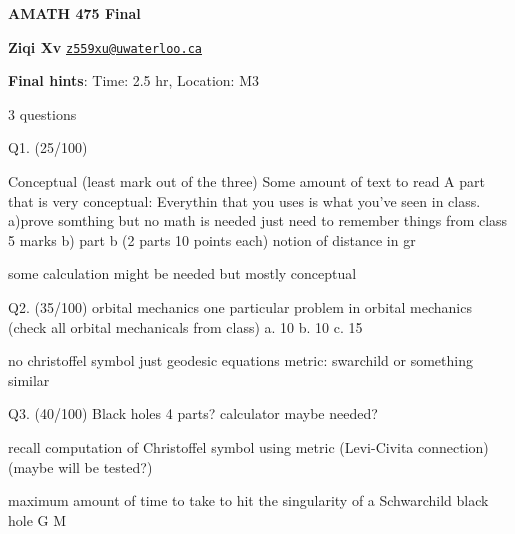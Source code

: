 





\begin{Large}
    \textsf{\textbf{AMATH 475 Final}}
    
\end{Large}

\vspace{1ex}

\textsf{\textbf{Ziqi Xv}}  \href{mailto:your.email@hotmail.com}{\texttt{z559xu@uwaterloo.ca}}



\textbf{Final hints}: 
Time: 2.5 hr, Location: M3

3 questions

Q1. (25/100)

Conceptual (least mark out of the three)
Some amount of text to read
A part that is very conceptual: Everythin that you uses is what you've seen in class.
a)prove somthing but no math is needed just need to remember things from class 5 marks
b) part b (2 parts 10 points each)
notion of distance in gr

some calculation might be needed but mostly conceptual

Q2. (35/100)
orbital mechanics
one particular problem in orbital mechanics (check all orbital mechanicals from class)
a. 10
b. 10
c. 15

no christoffel symbol just geodesic equations
metric: swarchild or something similar


Q3. (40/100)
Black holes
4 parts?
calculator maybe needed?

recall computation of Christoffel symbol using metric (Levi-Civita connection) (maybe will be tested?)

maximum amount of time to take to hit the singularity of a Schwarchild black hole \pi G M

